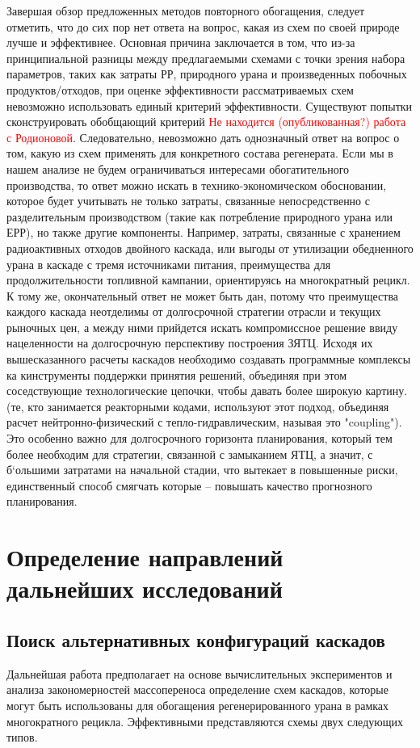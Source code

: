 Завершая обзор предложенных методов повторного обогащения, следует отметить, что до сих пор нет ответа на вопрос, какая из схем по своей природе лучше и эффективнее. Основная причина заключается в том, что из-за принципиальной разницы между предлагаемыми схемами с точки зрения набора параметров, таких как затраты РР, природного урана и произведенных побочных продуктов/отходов, при оценке эффективности рассматриваемых схем невозможно использовать единый критерий эффективности. Существуют попытки сконструировать обобщающий критерий \textcolor{red}{Не находится (опубликованная?) работа с Родионовой}. Следовательно, невозможно дать однозначный ответ на вопрос о том, какую из схем применять для конкретного состава регенерата. Если мы в нашем анализе не будем ограничиваться интересами обогатительного производства, то ответ можно искать в технико-экономическом обосновании, которое будет учитывать не только затраты, связанные непосредственно с разделительным производством (такие как потребление природного урана или ЕРР), но также другие компоненты. Например, затраты, связанные с хранением радиоактивных отходов двойного каскада, или выгоды от утилизации обедненного урана в каскаде с тремя источниками питания, преимущества для продолжительности топливной кампании, ориентируясь на многократный рецикл. К тому же, окончательный ответ не может быть дан, потому что преимущества каждого каскада неотделимы от долгосрочной стратегии отрасли и текущих рыночных цен, а между ними прийдется искать компромиссное решение ввиду нацеленности на долгосрочную перспективу построения ЗЯТЦ. Исходя их вышесказанного расчеты каскадов необходимо создавать программные комплексы ка кинструменты поддержки принятия решений, объединяя при этом соседствующие технологические цепочки, чтобы давать более широкую картину. (те, кто занимается реакторными кодами, используют этот подход, объединяя расчет нейтронно-физический с тепло-гидравлическим, называя это "coupling").  Это особенно важно для долгосрочного горизонта планирования, который тем более необходим для стратегии, связанной с замыканием ЯТЦ, а значит, с б`ольшими затратами на начальной стадии, что вытекает в повышенные риски, единственный способ смягчать которые -- повышать качество прогнозного планирования.


\section{Определение направлений дальнейших исследований}

\subsection{Поиск альтернативных конфигураций каскадов}
Дальнейшая работа предполагает на основе вычислительных экспериментов и анализа закономерностей массопереноса определение схем каскадов, которые могут быть использованы для обогащения регенерированного урана в рамках многократного рецикла. Эффективными представляются схемы двух следующих типов.

